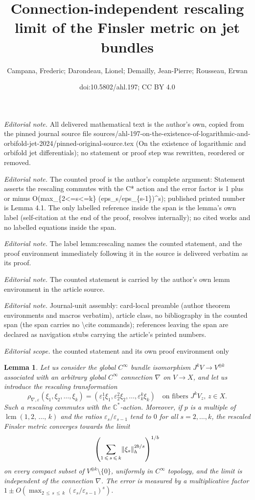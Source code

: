 \documentclass[10pt,a4paper]{article}
\title{Connection-independent rescaling limit of the Finsler metric on jet bundles}
\author{Campana, Frederic; Darondeau, Lionel; Demailly, Jean-Pierre; Rousseau, Erwan}
\date{doi:10.5802/ahl.197; CC BY 4.0}
\DeclareMathOperator{\lcm}{lcm}
\DeclarePairedDelimiter{\Abs}{\lVert}{\rVert}
\newcommand*\bC{\mathbb{C}}
\let\leq\leqslant
\newtheorem{lemm}[cdrthm]{Lemma}
\numberwithin{equation}{section}
\begin{document}
\maketitle
\setcounter{section}{4}
\setcounter{cdrthm}{0}
\noindent\textit{Editorial note.} All delivered mathematical text is the author's own, copied from the pinned journal source file sources/ahl-197-on-the-existence-of-logarithmic-and-orbifold-jet-2024/pinned-original-source.tex (On the existence of logarithmic and orbifold jet differentials); no statement or proof step was rewritten, reordered or removed.\par\medskip
\noindent\textit{Editorial note.} The counted proof is the author's complete argument: Statement asserts the rescaling commutes with the C* action and the error factor is 1 plus or minus O(max\_\{2<=s<=k\} (eps\_s/eps\_\{s-1\})\textasciicircum{}s); published printed number is Lemma 4.1. The only labelled reference inside the span is the lemma's own label (self-citation at the end of the proof, resolves internally); no cited works and no labelled equations inside the span.\par\medskip
\noindent\textit{Editorial note.} The label lemm:rescaling names the counted statement, and the proof environment immediately following it in the source is delivered verbatim as its proof.\par\medskip
\noindent\textit{Editorial note.} The counted statement is carried by the author's own lemm environment in the article source.\par\medskip
\noindent\textit{Editorial note.} Journal-unit assembly: card-local preamble (author theorem environments and macros verbatim), article class, no bibliography in the counted span (the span carries no \textbackslash{}cite commands); references leaving the span are declared as navigation stubs carrying the article's printed numbers.\par\medskip
\noindent\textit{Editorial scope.} the counted statement and its own proof environment only\par\medskip
\begin{lemm}\label{lemm:rescaling}
Let us consider the global $C^\infty$ bundle isomorphism
$J^kV\to V^{\oplus k}$ associated with an arbitrary global $C^\infty$ connection
$\nabla$ on $V\to X$, and let us introduce the rescaling transformation
\[
\rho_{\nabla,\varepsilon}(\xi_1,\xi_2,\dotsc,\xi_k)= \left(\varepsilon_1^1\xi_1,\varepsilon_2^2\xi_2,\dotsc,
\varepsilon_k^k\xi_k\right)\quad
\text{on fibers $J^kV_z$, $z\in X$}.
\]
Such a rescaling commutes with the $\bC^*$-action. Moreover, if $p$ is a multiple of $\lcm(1,2,\,\dotsc,\,k)$ and the ratios
$\varepsilon_s/\varepsilon_{s-1}$ tend to $0$ for all $s=2,\dotsc,k$, the rescaled Finsler metric
 converges towards the limit
\[
\left(\sum_{1\,\leq\,s\,\leq\,k}
\Abs{\xi_s}^{2b/s}_h\right)^{1/b}
\]
on every compact subset of $V^{\oplus k}\setminus\{0\}$, uniformly in $C^\infty$ topology, and the limit is independent of the connection $\nabla$. The error is measured by a multiplicative factor
$1\pm O(\max_{2\,\leq\,s\,\leq\,k}(\varepsilon_s/\varepsilon_{s-1})^s)$.
\end{lemm}
\end{document}
